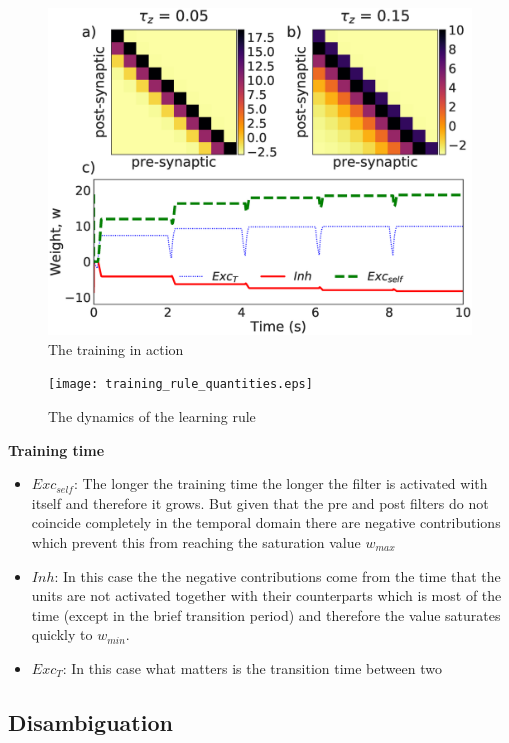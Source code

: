 \documentclass{esannV2}
\begin{document}
\begin{figure}[h!]
\centering
\includegraphics[scale=0.3]{training_rule.eps}
\caption{The training in action}\label{Fig:epochs}
\end{figure}


\begin{figure}[h!]
\centering
\texttt{[image: training\_rule\_quantities.eps]}
\caption{The dynamics of the learning rule}\label{Fig:learning_quantities}
\end{figure}

\textbf{Training time}
\begin{itemize}
\item  $Exc_{self}$: The longer the training time the longer the filter is activated with itself and therefore it grows. But given that the pre and post filters do not coincide completely in the temporal domain there are negative contributions which prevent this from reaching the saturation value $w_{max}$
\item  $Inh$: In this case the the negative contributions come from the time that the units are not activated together with their counterparts which is most of the time (except in the brief transition period) and therefore the value saturates quickly to $w_{min}$.
\item $Exc_{T}$: In this case what matters is the transition time between two 
\end{itemize} 
 
\subsection{Disambiguation}
\end{document}
